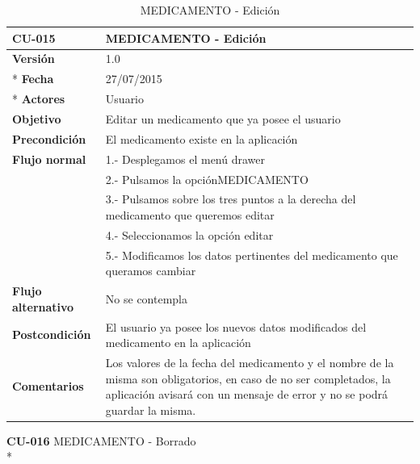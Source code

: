 \documentclass[../pfc.tex]{subfiles}
\begin{document}
		\begin{table}[H]
			\centering
			\begin{tabular}[t]{|p{3cm}|p{9.5cm}|}
				\hline \textbf{CU-015} & \textbf{MEDICAMENTO - Edición} \\*
				\hline\hline \textbf{Versión} & 1.0 \\ *
				\hline\hline \textbf{Fecha} & 27/07/2015 \\ *
				\hline\textbf{Actores} 	& Usuario\\*
				\hline \textbf{Objetivo} & Editar un medicamento que ya posee el usuario\\* 			
				\hline \textbf{Precondición} & El medicamento existe en la aplicación\\* 
				\hline \textbf{Flujo normal} & 1.- Desplegamos el menú drawer \\* 
				& 2.- Pulsamos la opciónMEDICAMENTO\\*	
				& 3.- Pulsamos sobre los tres puntos a la derecha del medicamento que queremos editar\\*	
				& 4.- Seleccionamos la opción editar\\*	
				& 5.- Modificamos los datos pertinentes del medicamento que queramos cambiar\\*	
				\hline \textbf{Flujo alternativo} & No se contempla \\* 
				\hline \textbf{Postcondición} & El usuario ya posee los nuevos datos modificados del medicamento en la aplicación \\* 
				\hline \textbf{Comentarios}   & Los valores de la fecha del medicamento y el nombre de la misma son obligatorios, en caso de no ser completados, la aplicación avisará con un mensaje de error y no se podrá guardar la misma.\\*
				\hline
			\end{tabular}
			\caption{MEDICAMENTO - Edición}
			\label{tabla:caso015}
		\end{table}
		
		
		
		\textbf{CU-016}	MEDICAMENTO - Borrado\\*
		
\end{document}
